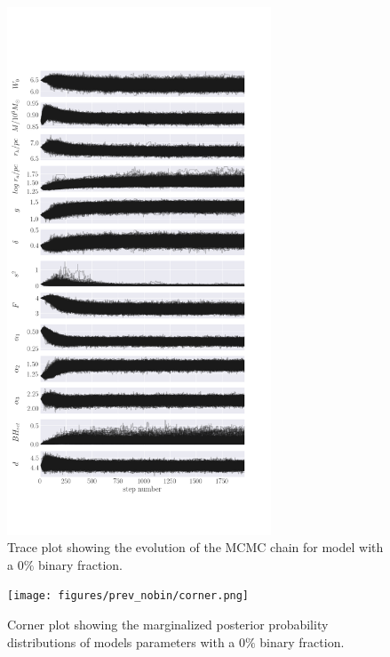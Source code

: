 \begin{figure}
	\centering
	\includegraphics[width=0.7\textwidth]{figures/prev_nobin/walkers.png}
	\caption{Trace plot showing the evolution of the MCMC chain for model with a $0\%$ binary
		fraction.}
	\label{fig:nobin_walkers}
\end{figure}

\begin{figure}
	\centering
	\texttt{[image: figures/prev\_nobin/corner.png]}
	\caption{Corner plot showing the marginalized posterior probability distributions of models
		parameters with a $0\%$ binary fraction.}
	\label{fig:nobin_corner}
\end{figure}


